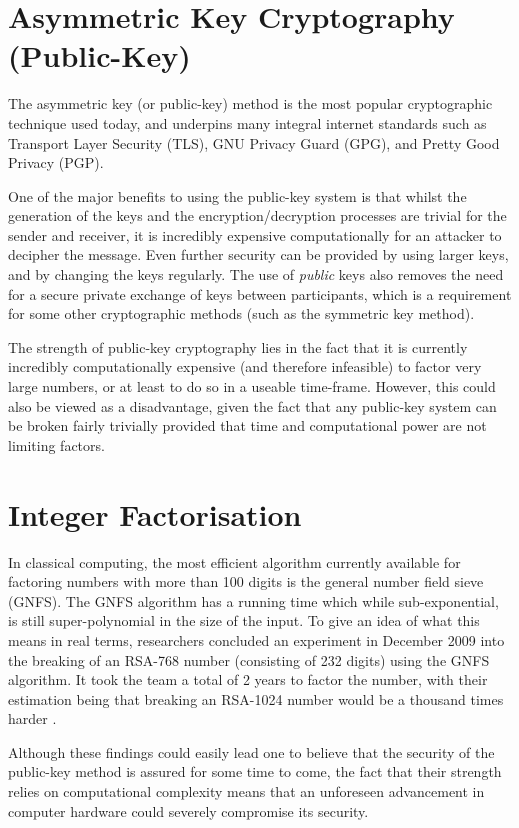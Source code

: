\documentclass[runningheads,a4paper]{llncs}
\begin{document}
\section{Asymmetric Key Cryptography (Public-Key)} 

The asymmetric key (or public-key) method is the most popular cryptographic technique used today, and underpins many integral internet standards such as Transport Layer Security (TLS), GNU Privacy Guard (GPG), and Pretty Good Privacy (PGP).

One of the major benefits to using the public-key system is that whilst the generation of the keys and the encryption/decryption processes are trivial for the sender and receiver, it is incredibly expensive computationally for an attacker to decipher the message. Even further security can be provided by using larger keys, and by changing the keys regularly. The use of \emph{public} keys also removes the need for a secure private exchange of keys between participants, which is a requirement for some other cryptographic methods (such as the symmetric key method).

The strength of public-key cryptography lies in the fact that it is currently incredibly computationally expensive (and therefore infeasible) to factor very large numbers, or at least to do so in a useable time-frame. However, this could also be viewed as a disadvantage, given the fact that any public-key system can be broken fairly trivially provided that time and computational power are not limiting factors.

\section{Integer Factorisation}

In classical computing, the most efficient algorithm currently available for factoring numbers with more than 100 digits is the general number field sieve (GNFS). The GNFS algorithm has a running time which while sub-exponential, is still super-polynomial in the size of the input. To give an idea of what this means in real terms, researchers concluded an experiment in December 2009 into the breaking of an RSA-768 number (consisting of 232 digits) using the GNFS algorithm. It took the team a total of 2 years to factor the number, with their estimation being that breaking an RSA-1024 number would be a thousand times harder \cite{Kleinjung:2010:FRM:1881412.1881436}. 

Although these findings could easily lead one to believe that the security of the public-key method is assured for some time to come, the fact that their strength relies on computational complexity means that an unforeseen advancement in  computer hardware could severely compromise its security. 
\end{document}
